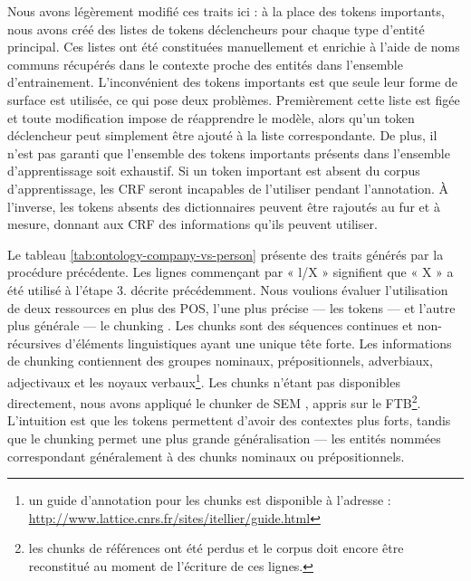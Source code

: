 \documentclass[PhD-Yoann-Dupont.tex]{subfiles}
\begin{document}
Nous avons légèrement modifié ces traits ici : à la place des tokens importants, nous avons créé des listes de tokens déclencheurs pour chaque type d'entité principal. Ces listes ont été constituées manuellement et enrichie à l'aide de noms communs récupérés dans le contexte proche des entités dans l'ensemble d'entrainement. L'inconvénient des tokens importants est que seule leur forme de surface est utilisée, ce qui pose deux problèmes. Premièrement cette liste est figée et toute modification impose de réapprendre le modèle, alors qu'un token déclencheur peut simplement être ajouté à la liste correspondante. De plus, il n'est pas garanti que l'ensemble des tokens importants présents dans l'ensemble d'apprentissage soit exhaustif. Si un token important est absent du corpus d'apprentissage, les CRF seront incapables de l'utiliser pendant l'annotation. À l'inverse, les tokens absents des dictionnaires peuvent être rajoutés au fur et à mesure, donnant aux CRF des informations qu'ils peuvent utiliser.

Le tableau \ref{tab:ontology-company-vs-person} présente des traits générés par la procédure précédente. Les lignes commençant par « l/X » signifient que « X » a été utilisé à l'étape 3. décrite précédemment. Nous voulions évaluer l'utilisation de deux ressources en plus des POS, l'une plus précise — les tokens — et l'autre plus générale — le chunking \citep{Abney91}. Les chunks sont des séquences continues et non-récursives d'éléments linguistiques ayant une unique tête forte. Les informations de chunking contiennent des groupes nominaux, prépositionnels, adverbiaux, adjectivaux et les noyaux verbaux\footnote{un guide d'annotation pour les chunks est disponible à l'adresse : \url{http://www.lattice.cnrs.fr/sites/itellier/guide.html}}. Les chunks n'étant pas disponibles directement, nous avons appliqué le chunker de SEM \citep{Tellier12,tellier2012segmenteur}, appris sur le FTB\footnote{les chunks de références ont été perdus et le corpus doit encore être reconstitué au moment de l'écriture de ces lignes.}. L'intuition est que les tokens permettent d'avoir des contextes plus forts, tandis que le chunking permet une plus grande généralisation — les entités nommées correspondant généralement à des chunks nominaux ou prépositionnels.
\end{document}
